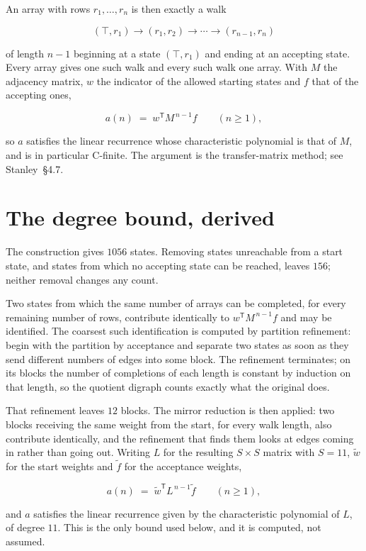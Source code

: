 \documentclass[11pt]{article}
\theoremstyle{definition}
\begin{document}
An array with rows $r_1,\dots,r_n$ is then exactly a walk

\[(\top,r_1) \to (r_1,r_2) \to \cdots \to (r_{n-1},r_n)\]

of length $n-1$ beginning at a state $(\top,r_1)$ and ending at an accepting state. Every array gives one such walk and every such walk one array. With $M$ the adjacency matrix, $w$ the indicator of the allowed starting states and $f$ that of the accepting ones,

\[a(n) \;=\; w^{\mathsf T} M^{\,n-1} f \qquad (n \ge 1),\]

so $a$ satisfies the linear recurrence whose characteristic polynomial is that of $M$, and is in particular C-finite. The argument is the transfer-matrix method; see Stanley~\S4.7.

\section{The degree bound, derived}

The construction gives $1056$ states. Removing states unreachable from a start state, and states from which no accepting state can be reached, leaves $156$; neither removal changes any count.

Two states from which the same number of arrays can be completed, for every remaining number of rows, contribute identically to $w^{\mathsf T}M^{\,n-1}f$ and may be identified. The coarsest such identification is computed by partition refinement: begin with the partition by acceptance and separate two states as soon as they send different numbers of edges into some block. The refinement terminates; on its blocks the number of completions of each length is constant by induction on that length, so the quotient digraph counts exactly what the original does.

That refinement leaves $12$ blocks. The mirror reduction is then applied: two blocks receiving the same weight from the start, for every walk length, also contribute identically, and the refinement that finds them looks at edges coming in rather than going out. Writing $L$ for the resulting $S \times S$ matrix with $S = 11$, $\tilde w$ for the start weights and $\tilde f$ for the acceptance weights,

\[a(n) \;=\; \tilde w^{\mathsf T} L^{\,n-1} \tilde f \qquad (n \ge 1),\]

and $a$ satisfies the linear recurrence given by the characteristic polynomial of $L$, of degree $11$. This is the only bound used below, and it is computed, not assumed.
\end{document}
